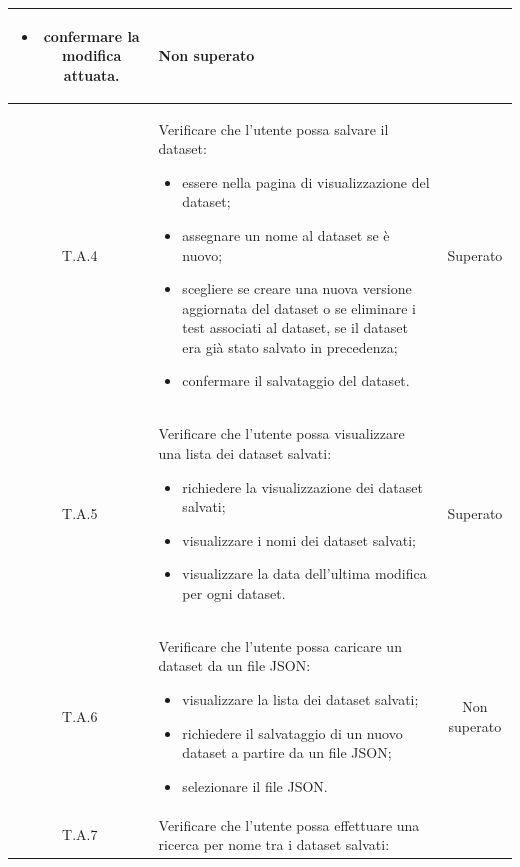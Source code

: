 \begin{tabularx}{\textwidth}{|c|X|c|}
\begin{itemize}
                            \item confermare la modifica attuata.
                        \end{itemize} & Non superato\\%
    \hline
    \label{ta:ta4}T.A.4 & Verificare che l'utente possa salvare il dataset:
                        \begin{itemize}
                            \item essere nella pagina di visualizzazione del dataset;
                            \item assegnare un nome al dataset se è nuovo;
                            \item scegliere se creare una nuova versione aggiornata del dataset o se eliminare i test associati al dataset, se il dataset era già stato salvato in precedenza;
                            \item confermare il salvataggio del dataset.
                        \end{itemize} & Superato\\ %
    \hline
    \label{ta:ta5}T.A.5 & Verificare che l'utente possa visualizzare una lista dei dataset salvati:
                        \begin{itemize}
                            \item richiedere la visualizzazione dei dataset salvati;
                            \item visualizzare i nomi dei dataset salvati;
                            \item visualizzare la data dell'ultima modifica per ogni dataset.
                        \end{itemize} & Superato\\ %
    \hline
    \label{ta:ta6}T.A.6 & Verificare che l'utente possa caricare un dataset da un file JSON:
                        \begin{itemize}
                            \item visualizzare la lista dei dataset salvati;
                            \item richiedere il salvataggio di un nuovo dataset a partire da un file JSON;
                            \item selezionare il file JSON.
                        \end{itemize} & Non superato\\ %
    \hline
    \label{ta:ta7}T.A.7 & Verificare che l'utente possa effettuare una ricerca per nome tra i dataset salvati:

\end{tabularx}
